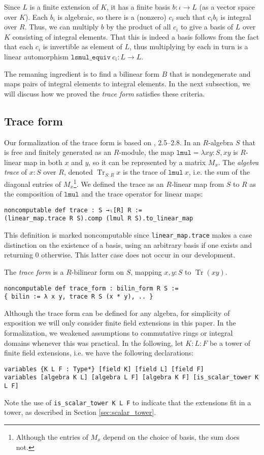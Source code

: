 \documentclass{lipics-v2021}
\newcommand{\lean}[1]{\texttt{#1}\xspace} %
\DeclareMathOperator{\Tr}{\mathrm{Tr}}
\begin{document}
Since $L$ is a finite extension of $K$, it has a finite basis $b : \iota \to L$ (as a vector space over $K$).
Each $b_i$ is algebraic, so there is a (nonzero) $c_i$ such that $c_i b_i$ is integral over $R$.
Thus, we can multiply $b$ by the product of all $c_i$ to give a basis of $L$ over $K$ consisting of integral elements.
That this is indeed a basis follows from the fact that each $c_i$ is invertible as element of $L$,
thus multiplying by each in turn is a linear automorphism $\lean{lsmul\_equiv}\ c_i : L \to L$.

The remaning ingredient is to find a bilinear form $B$ that is nondegenerate and maps pairs of integral elements to integral elements. In the next subsection, we will discuss how we proved the \emph{trace form} satisfies these criteria.

\subsection{Trace form}
Our formalization of the trace form is based on \cite{Neukirch}, 2.5--2.8.
In an $R$-algebra $S$ that is free and finitely generated as an $R$-module,
the map $\lean{lmul} = \lambda x y : S, xy$ is $R$-linear map in both $x$ and $y$, so it can be represented by a matrix $M_x$.
The \emph{algebra trace} of $x : S$ over $R$, denoted $\Tr_{S : R} x$ is the trace of $\lean{lmul}\ x$, i.e. the sum of the diagonal entries of $M_x$\footnote{Although the entries of $M_x$ depend on the choice of basis, the sum does not.}.
We defined the trace as an $R$-linear map from $S$ to $R$ as the composition of $\lean{lmul}$ and the trace operator for linear maps:
\begin{lstlisting}
noncomputable def trace : S →ₗ[R] R :=
(linear_map.trace R S).comp (lmul R S).to_linear_map
\end{lstlisting}
This definition is marked noncomputable since \lean{linear\_map.trace} makes a case distinction on the existence of a basis,
using an arbitrary basis if one exists and returning $0$ otherwise.
This latter case does not occur in our development.

The \emph{trace form} is a $R$-bilinear form on $S$, mapping $x, y : S$ to $\Tr(xy)$.
\begin{lstlisting}
noncomputable def trace_form : bilin_form R S :=
{ bilin := λ x y, trace R S (x * y), .. }
\end{lstlisting}

Although the trace form can be defined for any algebra,
for simplicity of exposition we will only consider finite field extensions in this paper.
In the formalization, we weakened assumptions to commutative rings or integral domains whenever this was practical.
In the following, let $K : L : F$ be a tower of finite field extensions,
i.e. we have the following declarations:
\begin{lstlisting}
variables {K L F : Type*} [field K] [field L] [field F]
variables [algebra K L] [algebra L F] [algebra K F] [is_scalar_tower K L F]
\end{lstlisting}
Note the use of \lean{is\_scalar\_tower K L F} to indicate that the extensions fit in a tower, as described in Section \ref{sec:scalar_tower}.
\end{document}
